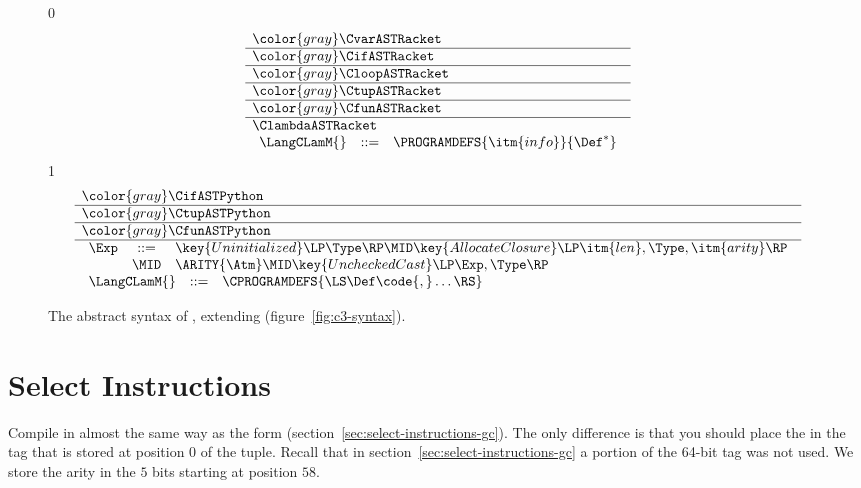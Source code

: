 \documentclass[7x10]{TimesAPriori_MIT}%
\newcommand{\gray}[1]{{\color{gray} #1}}
\def\racketEd{0}
\def\pythonEd{1}
\def\edition{1}
\newcommand{\pythonColor}[0]{}
\numberwithin{theorem}{chapter}
\numberwithin{definition}{chapter}
\numberwithin{equation}{chapter}
\begin{document}
\newcommand{\ClambdaASTPython}{
\begin{array}{lcl}
\Exp &::=& \key{Uninitialized}\LP \Type \RP
      \MID \key{AllocateClosure}\LP\itm{len},\Type, \itm{arity}\RP \\
      &\MID& \ARITY{\Atm}
      \MID \key{UncheckedCast}\LP\Exp,\Type\RP
\end{array}
}

\begin{figure}[tp]
  \begin{tcolorbox}[colback=white]
\small
{\if\edition\racketEd
\[
\begin{array}{l}
  \gray{\CvarASTRacket} \\ \hline
  \gray{\CifASTRacket} \\ \hline
  \gray{\CloopASTRacket} \\ \hline
  \gray{\CtupASTRacket} \\ \hline
  \gray{\CfunASTRacket} \\ \hline
  \ClambdaASTRacket \\
\begin{array}{lcl}
\LangCLamM{} & ::= & \PROGRAMDEFS{\itm{info}}{\Def^{*}}
\end{array}
\end{array}
\]
\fi}
{\if\edition\pythonEd\pythonColor
\[
  \begin{array}{l}
  \gray{\CifASTPython} \\ \hline
  \gray{\CtupASTPython} \\ \hline
  \gray{\CfunASTPython} \\ \hline
  \ClambdaASTPython \\
  \begin{array}{lcl}
    \LangCLamM{} & ::= & \CPROGRAMDEFS{\LS\Def\code{,}\ldots\RS} 
  \end{array}
  \end{array}
\]
\fi}
  \end{tcolorbox}

\caption{The abstract syntax of \LangCLam{}, extending \LangCFun{} (figure~\ref{fig:c3-syntax}).}
\label{fig:Clam-syntax}
\end{figure}


\section{Select Instructions}
\label{sec:select-instructions-Llambda}

Compile  in almost the
same way as the  form
(section~\ref{sec:select-instructions-gc}). The only difference is
that you should place the  in the tag that is stored at
position $0$ of the tuple. Recall that in
section~\ref{sec:select-instructions-gc} a portion of the 64-bit tag
was not used. We store the arity in the $5$ bits starting at position
$58$.
\end{document}

